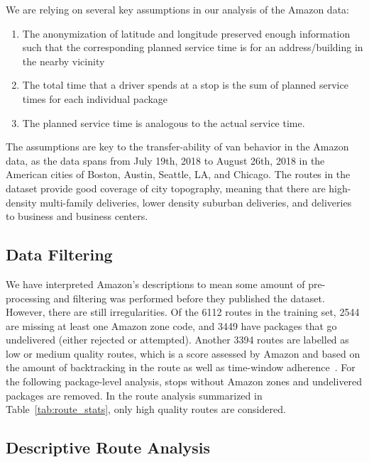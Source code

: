 \documentclass[12pt]{article}
\theoremstyle{plain}
\numberwithin{equation}{section}
\begin{document}
We are relying on several key assumptions in our analysis of the Amazon data:

\begin{enumerate}
    \item The anonymization of latitude and longitude preserved enough information such that the corresponding planned service time is for an address/building in the nearby vicinity
    \item The total time that a driver spends at a stop is the sum of planned service times for each individual package
    \item The planned service time is analogous to the actual service time. 
\end{enumerate}

The assumptions are key to the transfer-ability of van behavior in the Amazon data, as the data spans from July 19th, 2018 to August 26th, 2018 in the American cities of Boston, Austin, Seattle, LA, and Chicago. The routes in the dataset provide good coverage of city topography, meaning that there are high-density multi-family deliveries, lower density suburban deliveries, and deliveries to business and business centers.  

\subsection{Data Filtering}

We have interpreted Amazon's descriptions to mean some amount of pre-processing and filtering was performed before they published the dataset. However, there are still irregularities. Of the 6112 routes in the training set, 2544 are missing at least one Amazon zone code, and 3449 have packages that go undelivered (either rejected or attempted). Another 3394 routes are labelled as low or medium quality routes, which is a score assessed by Amazon and based on the amount of backtracking in the route as well as time-window adherence~\cite{amazon_dataset}. For the following package-level analysis, stops without Amazon zones and undelivered packages are removed. In the route analysis summarized in Table~\ref{tab:route_stats}, only high quality routes are considered.

\subsection{Descriptive Route Analysis}
\end{document}
